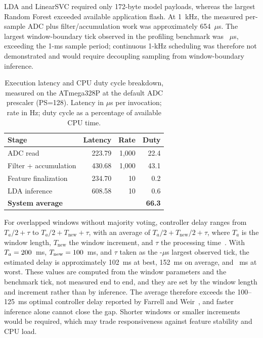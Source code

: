\documentclass[preprint,12pt]{elsarticle}
\begin{document}
LDA and LinearSVC required only 172-byte model payloads, whereas the largest Random Forest exceeded available application flash. At 1~kHz, the measured per-sample ADC plus filter/accumulation work was approximately 654~$\mu$s. The largest window-boundary tick observed in the profiling benchmark was \wcetTick{}~$\mu$s, exceeding the 1-ms sample period; continuous 1-kHz scheduling was therefore not demonstrated and would require decoupling sampling from window-boundary inference.

\begin{table}[htbp]
    \centering
    \caption{Execution latency and CPU duty cycle breakdown, measured on the
    ATmega328P at the default ADC prescaler (PS=128). Latency in $\mu$s per
    invocation; rate in Hz; duty cycle as a percentage of available CPU time.}
    \label{tab:latency}
    \begin{tabular}{lrrr}
        \toprule
        \textbf{Stage} & \textbf{Latency} & \textbf{Rate} & \textbf{Duty} \\
        \midrule
        ADC read              & 223.79 & 1,000 & 22.4 \\
        Filter + accumulation & 430.68 & 1,000 & 43.1 \\
        Feature finalization  & 234.70 & 10    & 0.2 \\
        LDA inference         & 608.58 & 10    & 0.6 \\
        \midrule
        \textbf{System average} & & & \textbf{66.3} \\
        \bottomrule
    \end{tabular}
\end{table}

For overlapped windows without majority voting, controller delay ranges from $T_a/2 + \tau$ to $T_a/2 + T_{\mathrm{new}} + \tau$, with an average of $T_a/2 + T_{\mathrm{new}}/2 + \tau$, where $T_a$ is the window length, $T_{\mathrm{new}}$ the window increment, and $\tau$ the processing time~\cite{Farrell2011delay}. With $T_a = 200{}$~ms, $T_{\mathrm{new}} = 100{}$~ms, and $\tau$ taken as the \wcetTick{}-$\mu$s largest observed tick, the estimated delay is approximately 102~ms at best, 152~ms on average, and \latencyTotal{}~ms at worst. These values are computed from the window parameters and the benchmark tick, not measured end to end, and they are set by the window length and increment rather than by inference. The average therefore exceeds the 100--125~ms optimal controller delay reported by Farrell and Weir~\cite{4126535}, and faster inference alone cannot close the gap. Shorter windows or smaller increments would be required, which may trade responsiveness against feature stability and CPU load.
\end{document}
